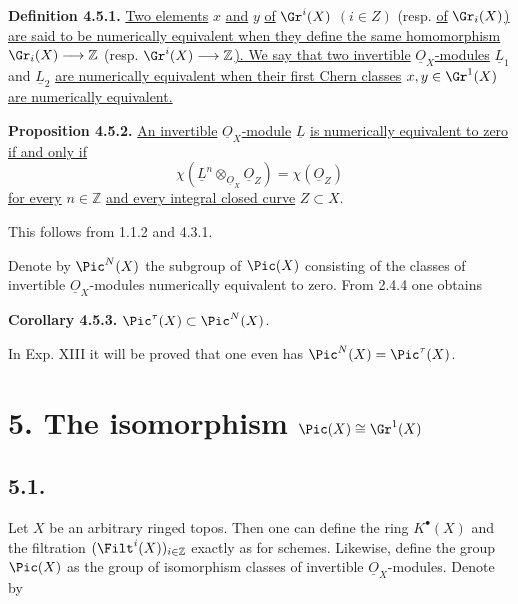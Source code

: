 \textbf{Definition 4.5.1.} \uline{Two elements} \(x\) \uline{and} \(y\) \uline{of} \(\Gr^i(X)\) \((i\in Z)\) (resp. \uline{of} \(\Gr_i(X)\)\uline{) are said to be numerically equivalent when they define the same homomorphism} \(\Gr_i(X)\longrightarrow\mathbb Z\) (resp. \(\Gr^i(X)\longrightarrow\mathbb Z\)\uline{). We say that two invertible} \(\underline{O}_X\)\uline{-modules} \(\underline{L}_1\) and \(\underline{L}_2\) \uline{are numerically equivalent when their first Chern classes} \(x,y\in\Gr^1(X)\) \uline{are numerically equivalent.}

\textbf{Proposition 4.5.2.} \uline{An invertible} \(\underline{O}_X\)\uline{-module} \(\underline{L}\) \uline{is numerically equivalent to zero if and only if}
\begin{equation}\tag{4.5.3}
 \chi(\underline{L}^n\otimes_{\underline{O}_X}\underline{O}_Z)=\chi(\underline{O}_Z)
\end{equation}
\uline{for every} \(n\in\mathbb Z\) \uline{and every integral closed curve} \(Z\subset X\).

This follows from 1.1.2 and 4.3.1.

Denote by \(\Pic^N(X)\) the subgroup of \(\Pic(X)\) consisting of the classes of invertible \(\underline{O}_X\)-modules numerically equivalent to zero. From 2.4.4 one obtains

\textbf{Corollary 4.5.3.} \(\Pic^\tau(X)\subset \Pic^N(X)\).

In Exp. XIII it will be proved that one even has \(\Pic^N(X)=\Pic^\tau(X)\).

\section*{5. The isomorphism \(\Pic(X)\cong\Gr^1(X)\)}

\subsection*{5.1.}
Let \(X\) be an arbitrary ringed topos. Then one can define the ring \(K^{\bullet}(X)\) and the filtration \((\Filt^i(X))_{i\in\mathbb Z}\) exactly as for schemes. Likewise, define the group \(\Pic(X)\) as the group of isomorphism classes of invertible \(\underline{O}_X\)-modules. Denote by


%

